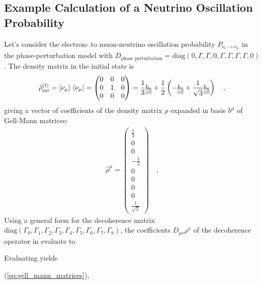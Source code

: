 \subsection{Example Calculation of a Neutrino Oscillation Probability}
Let's consider the electron- to muon-neutrino oscillation probability $P_{\nu_e\rightarrow\nu_\mu}$ in the phase-perturbation model with $D_\text{phase perturbation} = \text{diag}(0, \Gamma, \Gamma, 0, \Gamma, \Gamma, \Gamma, \Gamma, 0)$. The density matrix in the initial state is
%
\begin{align} \label{eq:matrix_gell_mann_expansion}
    \hat{\rho}^\text{(f)}_{\mu\mu} = \ket{\nu_\mu}\bra{\nu_\mu} 
    = 
    \begin{pmatrix} 0 & 0 & 0 \\ 0 & 1 & 0 \\ 0 & 0 & 0 \end{pmatrix}
    =
    \frac{1}{3}\underline{\underline{b_0}} + \frac{1}{2} \left( - \underline{\underline{b_3}} + \frac{1}{\sqrt{3}} \underline{\underline{b_8}} \right)
    \quad \text{,}
\end{align}
%
giving a vector of coefficients of the density matrix $\rho$ expanded in basis $b^\mu$ of Gell-Mann matrices:
%
\begin{align} \label{eq:rho_coefficients}
    \hat{\rho}^{\mu}
    = 
    \begin{pmatrix}
    \frac{1}{3} \\ 0 \\ 0 \\ - \frac{1}{2} \\ 0 \\ 0 \\ 0 \\ 0 \\ \frac{1}{\sqrt{3}}    
    \end{pmatrix}
    \quad \text{,}
\end{align}
%
Using a general form for the decoherence matrix $\text{diag}(\Gamma_0,\Gamma_1,\Gamma_2,\Gamma_3,\Gamma_4,\Gamma_5,\Gamma_6,\Gamma_7,\Gamma_8)$, the coefficients $D_{\mu\nu}\rho^\nu$ of the decoherence operator in  evaluate to

Evaluating  yields

(\ref{eq:gell_mann_matrices}), 



